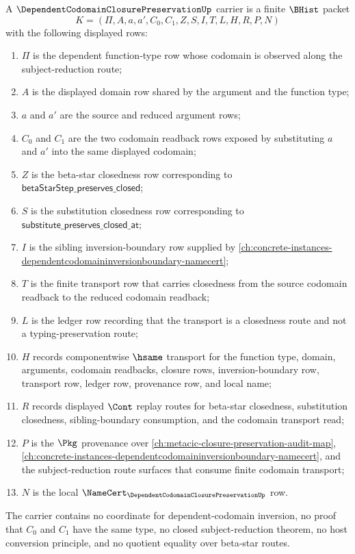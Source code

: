 \begin{definition}
\label{def:dependent-codomain-closure-preservation-carrier}
A $\DependentCodomainClosurePreservationUp$ carrier is a finite $\BHist$ packet
$$
K=(\Pi,A,a,a',C_0,C_1,Z,S,I,T,L,H,R,P,N)
$$
with the following displayed rows:
\begin{enumerate}
\item $\Pi$ is the dependent function-type row whose codomain is observed along the subject-reduction route;
\item $A$ is the displayed domain row shared by the argument and the function type;
\item $a$ and $a'$ are the source and reduced argument rows;
\item $C_0$ and $C_1$ are the two codomain readback rows exposed by substituting $a$ and $a'$ into the same displayed codomain;
\item $Z$ is the beta-star closedness row corresponding to $\mathsf{betaStarStep\_preserves\_closed}$;
\item $S$ is the substitution closedness row corresponding to $\mathsf{substitute\_preserves\_closed\_at}$;
\item $I$ is the sibling inversion-boundary row supplied by \autoref{ch:concrete-instances-dependentcodomaininversionboundary-namecert};
\item $T$ is the finite transport row that carries closedness from the source codomain readback to the reduced codomain readback;
\item $L$ is the ledger row recording that the transport is a closedness route and not a typing-preservation route;
\item $H$ records componentwise $\hsame$ transport for the function type, domain, arguments, codomain readbacks, closure rows, inversion-boundary row, transport row, ledger row, provenance row, and local name;
\item $R$ records displayed $\Cont$ replay routes for beta-star closedness, substitution closedness, sibling-boundary consumption, and the codomain transport read;
\item $P$ is the $\Pkg$ provenance over \autoref{ch:metacic-closure-preservation-audit-map}, \autoref{ch:concrete-instances-dependentcodomaininversionboundary-namecert}, and the subject-reduction route surfaces that consume finite codomain transport;
\item $N$ is the local $\NameCert_{\DependentCodomainClosurePreservationUp}$ row.
\end{enumerate}
The carrier contains no coordinate for dependent-codomain inversion, no proof that $C_0$ and $C_1$ have the same type, no closed subject-reduction theorem, no host conversion principle, and no quotient equality over beta-star routes.
\end{definition}

